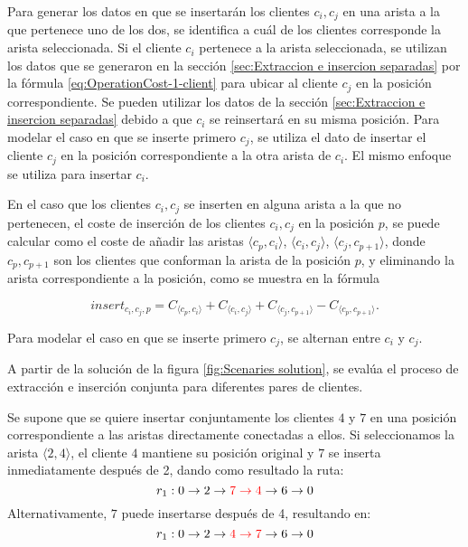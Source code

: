 \documentclass[12pt]{report}
\begin{document}
	Para generar los datos en que se insertarán los clientes $c_i,c_j$ en una arista a la que pertenece uno de los dos, se identifica a cuál de los clientes corresponde la arista seleccionada. Si el cliente $c_i$ pertenece a la arista seleccionada, se utilizan los datos que se generaron en la sección \ref{sec:Extraccion e insercion separadas} por la fórmula \ref{eq:OperationCost-1-client}  para ubicar al cliente $c_j$ en la posición correspondiente. Se pueden utilizar los datos de la sección \ref{sec:Extraccion e insercion separadas} debido a que $c_i$ se reinsertará en su misma posición. Para modelar el caso en que se inserte primero $c_j$, se utiliza el dato de insertar el cliente $c_j$ en la posición correspondiente a la otra arista de $c_i$. El mismo enfoque se utiliza para insertar $c_i$.

	En el caso que los clientes $c_i,c_j$ se inserten en alguna arista a la que no pertenecen, el coste de inserción de los clientes $c_i,c_j$ en la posición $p$, se puede calcular como el coste de añadir las aristas $\langle c_p,c_i \rangle$, $\langle c_i,c_j \rangle$, $\langle c_j,c_{p+1} \rangle$, donde $c_p,c_{p+1}$ son los clientes que conforman la arista de la posición $p$, y eliminando la arista correspondiente a la posición, como se muestra en la fórmula

	\begin{equation}
		insert_{c_i,c_j,p} = C_{\langle c_p,c_i \rangle} +C_{\langle c_i,c_j \rangle}+C_{\langle c_j,c_{p+1} \rangle}-C_{\langle c_p,c_{p+1} \rangle}\textit{.}
		\label{eq:insert-together}
	\end{equation}

	Para modelar el caso en que se inserte primero $c_j$, se alternan entre $c_i$ y $c_j$.

	A partir de la solución de la figura \ref{fig:Scenaries solution}, se evalúa el proceso de extracción e inserción conjunta para diferentes pares de clientes.

	Se supone que se quiere insertar conjuntamente los clientes $4$ y $7$ en una posición correspondiente a las aristas directamente conectadas a ellos. Si seleccionamos la arista $\langle 2, 4 \rangle$, el cliente $4$ mantiene su posición original y $7$ se inserta inmediatamente después de 2, dando como resultado la ruta:
	\[
	r_1: 0 \rightarrow 2 \rightarrow \textcolor{red}{7 \rightarrow 4} \rightarrow 6 \rightarrow 0
	\]
	Alternativamente, $7$ puede insertarse después de 4, resultando en:
	\[
	r_1: 0 \rightarrow 2 \rightarrow \textcolor{red}{4 \rightarrow 7}\rightarrow 6 \rightarrow 0
	\]
\end{document}
